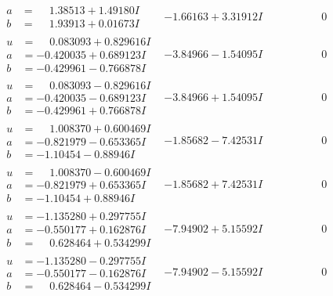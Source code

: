 \documentclass[1p]{elsarticle_modified}
\theoremstyle{definition}
\begin{document}
$$\begin{array}{c|c|c}
\begin{aligned}
a &= \phantom{-}1.38513 + 1.49180 I \\
b &= \phantom{-}1.93913 + 0.01673 I\end{aligned}
 & -1.66163 + 3.31912 I & \phantom{-0.000000 } 0 \\ \hline\begin{aligned}
u &= \phantom{-}0.083093 + 0.829616 I \\
a &= -0.420035 + 0.689123 I \\
b &= -0.429961 - 0.766878 I\end{aligned}
 & -3.84966 - 1.54095 I & \phantom{-0.000000 } 0 \\ \hline\begin{aligned}
u &= \phantom{-}0.083093 - 0.829616 I \\
a &= -0.420035 - 0.689123 I \\
b &= -0.429961 + 0.766878 I\end{aligned}
 & -3.84966 + 1.54095 I & \phantom{-0.000000 } 0 \\ \hline\begin{aligned}
u &= \phantom{-}1.008370 + 0.600469 I \\
a &= -0.821979 - 0.653365 I \\
b &= -1.10454 - 0.88946 I\end{aligned}
 & -1.85682 - 7.42531 I & \phantom{-0.000000 } 0 \\ \hline\begin{aligned}
u &= \phantom{-}1.008370 - 0.600469 I \\
a &= -0.821979 + 0.653365 I \\
b &= -1.10454 + 0.88946 I\end{aligned}
 & -1.85682 + 7.42531 I & \phantom{-0.000000 } 0 \\ \hline\begin{aligned}
u &= -1.135280 + 0.297755 I \\
a &= -0.550177 + 0.162876 I \\
b &= \phantom{-}0.628464 + 0.534299 I\end{aligned}
 & -7.94902 + 5.15592 I & \phantom{-0.000000 } 0 \\ \hline\begin{aligned}
u &= -1.135280 - 0.297755 I \\
a &= -0.550177 - 0.162876 I \\
b &= \phantom{-}0.628464 - 0.534299 I\end{aligned}
 & -7.94902 - 5.15592 I & \phantom{-0.000000 } 0 \\ \hline\begin{aligned}

\end{aligned}
\end{array}$$
\end{document}
